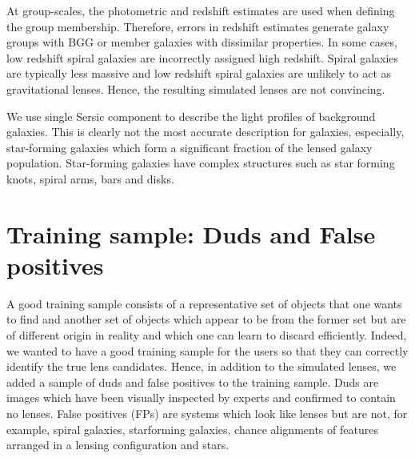 \documentclass[useAMS,usenatbib,a4paper]{mn2e}
\begin{document}
At group-scales, the photometric and redshift estimates are used when
defining the group membership. Therefore, errors in redshift estimates generate
galaxy groups with BGG or member galaxies with dissimilar properties. In some
cases, low redshift spiral galaxies are incorrectly assigned high redshift.
Spiral galaxies are typically less massive and low redshift spiral galaxies are
unlikely to act as gravitational lenses. Hence, the resulting simulated lenses
are not convincing.

We use single Sersic component to describe the light profiles of background
galaxies. This is clearly not the most accurate description for galaxies,
especially, star-forming galaxies which form a significant fraction of the
lensed galaxy population. Star-forming galaxies have complex structures such as
star forming knots, spiral arms, bars and disks. 


%


\section{Training sample: Duds and False positives}
\label{sec:dfp}

A good training sample consists of a representative set of objects that
one wants to find and another set of objects which appear to be from the
former set but are of different origin in reality and which one can
learn to discard efficiently. Indeed, we wanted to have a good training
sample for the \sw users so that they can correctly identify the true
lens candidates. Hence, in addition to the simulated lenses, we
added a sample of duds and false positives to the training sample. Duds
are images which have been visually inspected by experts and confirmed
to contain no lenses.  False positives (FPs) are systems which look like
lenses but are not, for example, spiral galaxies, starforming galaxies,
chance alignments of features arranged in a lensing configuration and
stars. 
\end{document}
